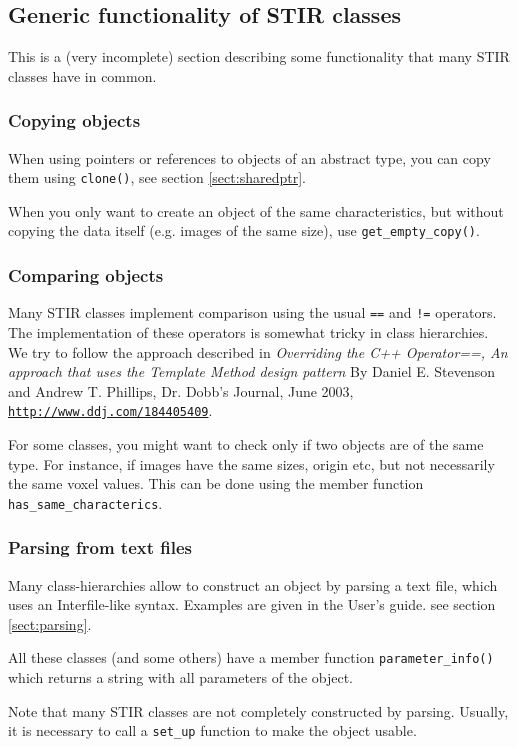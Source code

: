 \documentclass{article}
\def\R2Lurl#1#2{\mbox{\href{#1}{\tt #2}}}
\begin{document}
\subsection{Generic functionality of STIR classes}
This is a (very incomplete) section describing some functionality that
many STIR classes have in common.

\subsubsection{Copying objects}
When using pointers or references to objects of an abstract type, you can copy 
them using \texttt{clone()}, see section \ref{sect:sharedptr}.


When you only want to create an object of the same characteristics, but without
copying the data itself (e.g. images of the same size), use \texttt{get\_empty\_copy()}.

\subsubsection{Comparing objects}
Many STIR classes implement comparison using the usual \texttt{==} and 
\texttt{!=} operators. The implementation of these operators is somewhat 
tricky in class hierarchies. We try to follow the approach described in
\textit{Overriding the C++ Operator==, An approach that uses the 
Template Method design pattern} By Daniel E. Stevenson and Andrew T. Phillips,
Dr. Dobb's Journal, June 2003, 
\R2Lurl{http://www.ddj.com/184405409}{http://www.ddj.com/184405409}.

For some classes, you might want to check only if two objects are of the same
type. For instance, if images have the same sizes, origin etc, but not 
necessarily the same voxel values. This can be done using the member
function \texttt{has\_same\_characterics}.

\subsubsection{Parsing from text files}
Many class-hierarchies allow to construct an object by parsing a 
text file, which uses an Interfile-like syntax. Examples
are given in the User's guide. see section \ref{sect:parsing}.

All these classes (and some others) have a member function 
\texttt{parameter\_info()} which returns a string with all parameters
of the object.

Note that many STIR classes are not completely constructed by parsing.
Usually, it is necessary to call a \texttt{set\_up} function to make
the object usable.
\end{document}
